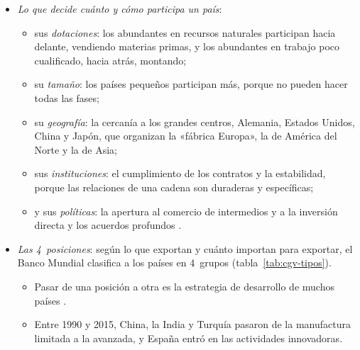 \documentclass[11pt]{article}
\begin{document}
\begin{itemize}
\item \emph{Lo que decide cuánto y cómo participa un país}\nocite{BM2020WDR}:
  \begin{itemize}
  \item sus \emph{dotaciones}: los abundantes en recursos naturales participan hacia delante, vendiendo materias primas, y los abundantes en trabajo poco cualificado, hacia atrás, montando;
  \item su \emph{tamaño}: los países pequeños participan más, porque no pueden hacer todas las fases;
  \item su \emph{geografía}: la cercanía a los grandes centros, Alemania, Estados Unidos, China y Japón, que organizan la «fábrica Europa», la de América del Norte y la de Asia;
  \item sus \emph{instituciones}: el cumplimiento de los contratos y la estabilidad, porque las relaciones de una cadena son duraderas y específicas;
  \item y sus \emph{políticas}: la apertura al comercio de intermedios y a la inversión directa y los acuerdos profundos .
  \end{itemize}
\item \emph{Las 4~posiciones}: según lo que exportan y cuánto importan para exportar, el Banco Mundial clasifica a los países en 4~grupos (tabla~\ref{tab:cgv-tipos}).
  \begin{itemize}
  \item Pasar de una posición a otra es la estrategia de desarrollo de muchos países .
  \item Entre 1990 y 2015, China, la India y Turquía pasaron de la manufactura limitada a la avanzada, y España entró en las actividades innovadoras\nocite{BM2020WDR}.
  \end{itemize}
\end{itemize}
\end{document}
